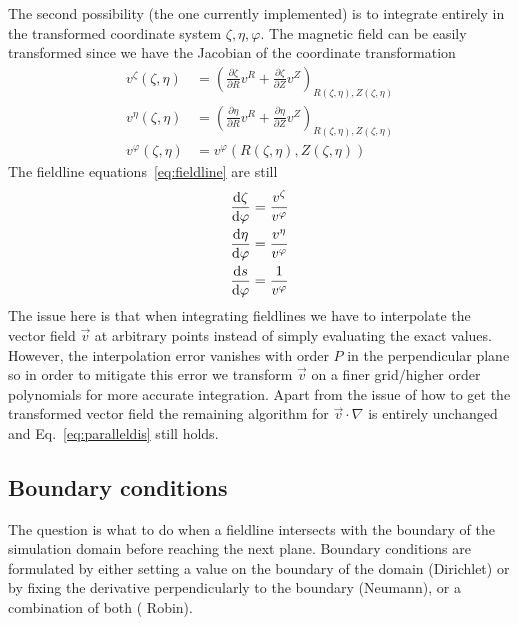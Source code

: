 The second possibility (the one currently implemented)
is to integrate entirely in the
transformed coordinate system $\zeta, \eta, \varphi$.
The magnetic field can be easily transformed since we have the
Jacobian of the coordinate transformation
\begin{align}
    v^\zeta(\zeta, \eta) &= \left(\frac{\partial \zeta}{\partial R} v^{R} + \frac{\partial \zeta}{\partial Z}v^Z\right)_{R(\zeta, \eta), Z(\zeta, \eta)} \\
    v^\eta(\zeta, \eta) &= \left(\frac{\partial \eta}{\partial R} v^{R} + \frac{\partial \eta}{\partial Z}v^Z\right)_{R(\zeta, \eta), Z(\zeta, \eta)} \\
    v^\varphi(\zeta, \eta) &= v^\varphi({R(\zeta, \eta), Z(\zeta, \eta)})
    \label{eq:field_trafo}
\end{align}
The fieldline equations~\eqref{eq:fieldline} are still
\begin{subequations}
\begin{align}
\frac{\mathrm{d} \zeta}{\mathrm{d}\varphi} &= \frac{v^\zeta}{v^\varphi}\\
\frac{\mathrm{d} \eta}{\mathrm{d}\varphi} &= \frac{v^\eta}{v^\varphi}\\
\frac{\mathrm{d} s}{\mathrm{d} \varphi} &= \frac{1}{v^\varphi}
\end{align}
\label{eq:fieldlines_coords}
\end{subequations}
The issue here is that when integrating fieldlines we
have to interpolate the vector field $\vec v$ at arbitrary points
instead of simply evaluating the exact values.
However, the interpolation error vanishes with order $P$ in the
perpendicular plane so in order to mitigate this error
we transform $\vec v$ on a finer grid/higher order polynomials for more accurate
integration.
Apart from the issue of how to get the transformed vector field
the remaining algorithm for $\vec v\cdot\nabla$ is entirely unchanged
and Eq.~\eqref{eq:paralleldis} still holds.

\subsection{Boundary conditions} \label{sec:boundary}
The question is what to do when a fieldline intersects with the boundary
of the simulation domain before reaching the next plane.
Boundary conditions are formulated by either setting a value
on the boundary of the domain (Dirichlet) or by fixing
the derivative perpendicularly to the boundary (Neumann), or
a combination of both ( Robin).

